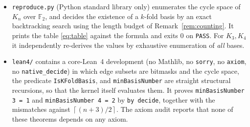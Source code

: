 \documentclass[11pt]{article}
\theoremstyle{definition}
\theoremstyle{remark}
\newcommand{\F}{\mathbb{F}}
\newcommand{\ceil}[1]{\left\lceil #1 \right\rceil}
\begin{document}
\begin{itemize}
\item \texttt{reproduce.py} (Python standard library only) enumerates the cycle
  space of $K_n$ over $\F_2$, and decides the existence of a $k$-fold basis by
  an exact backtracking search using the length budget of
  Remark~\ref{rem:counting}. It prints the table \eqref{eq:table} against the
  formula and exits $0$ on \texttt{PASS}. For $K_3,K_4$ it independently
  re-derives the values by exhaustive enumeration of \emph{all} bases.
\item \texttt{lean4/} contains a core-Lean~4 development (no Mathlib, no
  \texttt{sorry}, no \texttt{axiom}, no \texttt{native\_decide}) in which edge
  subsets are bitmasks and the cycle space, the predicate
  \texttt{IsKFoldBasis}, and \texttt{minBasisNumber} are straight structural
  recursions, so that the kernel itself evaluates them. It proves
  \texttt{minBasisNumber 3 = 1} and \texttt{minBasisNumber 4 = 2} by
  \texttt{by decide}, together with the mismatches against
  $\ceil{(n+3)/2}$. The axiom audit reports that none of these theorems
  depends on any axiom.
\end{itemize}
\end{document}
